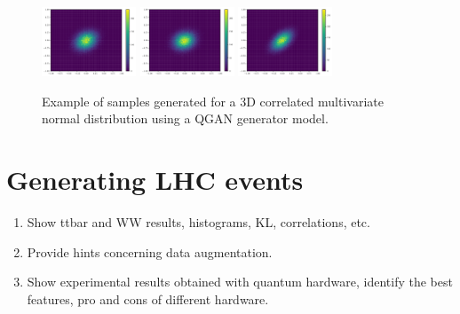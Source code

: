\documentclass[twocolumn,preprintnumbers,superscriptaddress]{revtex4-2}
\begin{document}
\begin{figure}
  \includegraphics[width=0.25\textwidth]{plots/3Dgaussian_posdef/1-2_FAKE_100000_100_3_5_2_10000_128_0.5.pdf}%
  \includegraphics[width=0.25\textwidth]{plots/3Dgaussian_posdef/2-3_FAKE_100000_100_3_5_2_10000_128_0.5.pdf}%
  \includegraphics[width=0.25\textwidth]{plots/3Dgaussian_posdef/3-1_FAKE_100000_100_3_5_2_10000_128_0.5.pdf}
  \caption{\label{fig:3dgauss}Example of samples generated for a 3D correlated
  multivariate normal distribution using a QGAN generator model.}
\end{figure}

\section{Generating LHC events}
\label{sec:lhc}

\begin{enumerate}
  \item Show ttbar and WW results, histograms, KL, correlations, etc.
  \item Provide hints concerning data augmentation.
  \item Show experimental results obtained with quantum hardware, identify the
  best features, pro and cons of different hardware.
\end{enumerate}
\end{document}
